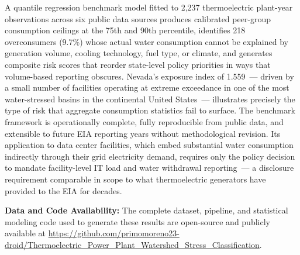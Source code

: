 \documentclass[11pt, letterpaper]{article}
\begin{document}
A quantile regression benchmark model fitted to 2{,}237 thermoelectric plant-year observations across six public data sources produces calibrated peer-group consumption ceilings at the 75th and 90th percentile, identifies 218 overconsumers (9.7\%) whose actual water consumption cannot be explained by generation volume, cooling technology, fuel type, or climate, and generates composite risk scores that reorder state-level policy priorities in ways that volume-based reporting obscures. Nevada's exposure index of 1.559~--- driven by a small number of facilities operating at extreme exceedance in one of the most water-stressed basins in the continental United States~--- illustrates precisely the type of risk that aggregate consumption statistics fail to surface. The benchmark framework is operationally complete, fully reproducible from public data, and extensible to future EIA reporting years without methodological revision. Its application to data center facilities, which embed substantial water consumption indirectly through their grid electricity demand, requires only the policy decision to mandate facility-level IT load and water withdrawal reporting~--- a disclosure requirement comparable in scope to what thermoelectric generators have provided to the EIA for decades.

\textbf{Data and Code Availability:} The complete dataset, pipeline, and statistical modeling code used to generate these results are open-source and publicly available at \url{https://github.com/primomoreno23-droid/Thermoelectric_Power_Plant_Watershed_Stress_Classification}.

\end{document}

